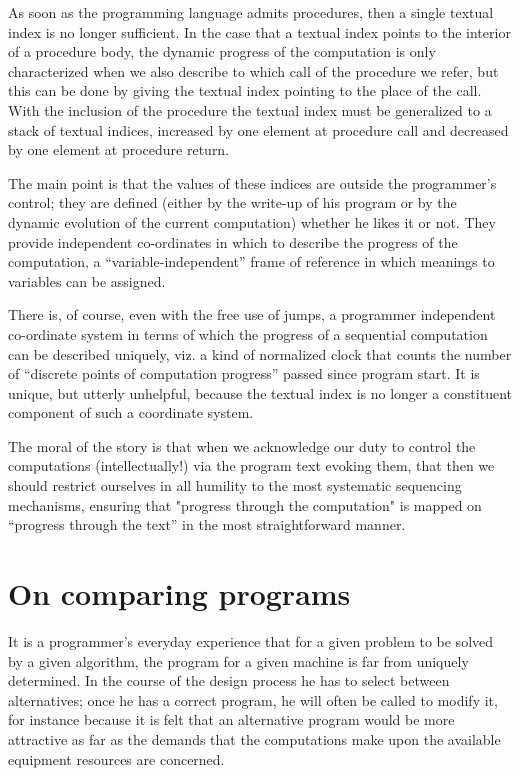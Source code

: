 As soon as the programming language admits procedures, then a single textual index is no longer sufficient. In the case that a textual index points to the interior of a procedure body, the dynamic progress of the computation is only characterized when we also describe to which call of the procedure we refer, but this can be done by giving the textual index pointing to the place of the call. With the inclusion of the procedure the textual index must be generalized to a stack of textual indices, increased by one element at procedure call and decreased by one element at procedure return.

The main point is that the values of these indices are outside the programmer's control; they are defined (either by the write-up of his program or by the dynamic evolution of the current computation) whether he likes it or not. They provide independent co-ordinates in which to describe the progress of the computation, a ``variable-independent'' frame of reference in which meanings to variables can be assigned.

There is, of course, even with the free use of jumps, a programmer independent co-ordinate system in terms of which the progress of a sequential computation can be described uniquely, viz. a kind of normalized clock that counts the number of ``discrete points of computation progress'' passed since program start. It is unique, but utterly unhelpful, because the textual index is no longer a constituent component of such a coordinate system.

The moral of the story is that when we acknowledge our duty to control the computations (intellectually!) via the program text evoking them, that then we should restrict ourselves in all humility to the most systematic sequencing mechanisms, ensuring that "progress through the computation" is mapped on ``progress through the text'' in the most straightforward manner.

\section{On comparing programs}
\label{sec:comparing-programs}

It is a programmer's everyday experience that for a given problem to be solved by a given algorithm, the program for a given machine is far from uniquely determined. In the course of the design process he has to select between alternatives; once he has a correct program, he will often be called to modify it, for instance because it is felt that an alternative program would be more attractive as far as the demands that the computations make upon the available equipment resources are concerned.

